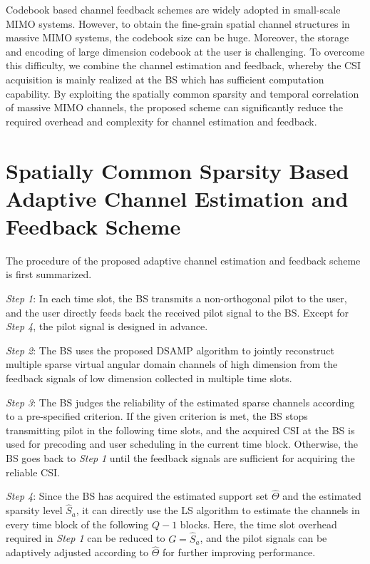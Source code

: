 \documentclass[final]{IEEEtran}
\begin{document}
 Codebook based channel feedback schemes are widely adopted in small-scale MIMO systems.
 However, to obtain the fine-grain spatial channel structures in massive MIMO systems, the
 codebook size can be huge. Moreover, the storage and encoding of large dimension codebook
 at the user is challenging. To overcome this difficulty, we combine the channel estimation
 and feedback, whereby the CSI acquisition is mainly realized at the BS which has sufficient
 computation capability. By exploiting the spatially common sparsity and temporal
 correlation of massive MIMO channels, the proposed scheme can significantly reduce the
 required overhead and complexity for channel estimation and feedback.

\section{Spatially Common Sparsity Based Adaptive Channel Estimation and Feedback Scheme}\label{S3}

 The procedure of the proposed adaptive channel estimation and feedback scheme is first
 summarized.

\emph{Step 1}: In each time slot, the BS transmits a non-orthogonal pilot to the user,
 and the user directly feeds back the received pilot signal to the BS. Except for %
 \emph{Step 4}, the pilot signal is designed in advance.

\emph{Step 2}: The BS uses the proposed DSAMP algorithm to jointly reconstruct multiple
 sparse virtual angular domain channels of high dimension from the feedback signals of low
 dimension collected in multiple time slots.

\emph{Step 3}: The BS judges the reliability of the estimated sparse channels according
 to a pre-specified criterion. If the given criterion is met, the BS stops transmitting
 pilot in the following time slots, and the acquired CSI at the BS is used for precoding
 and user scheduling in the current time block. Otherwise, the BS goes back to
 \emph{Step 1} until the feedback signals are sufficient for acquiring the reliable CSI.

\emph{Step 4}: Since the BS has acquired the estimated support set $\widehat{\Theta}$
 and the estimated sparsity level $\widehat{S}_a$,
 it can directly use the LS algorithm to estimate the channels in every time block of
 the following $Q-1$ blocks. Here, the time slot overhead required in \emph{Step 1}
 can be reduced to $G=\widehat{S}_a$, and the pilot signals can be adaptively adjusted
 according to $\widehat{\Theta}$ for further improving performance.
\end{document}
